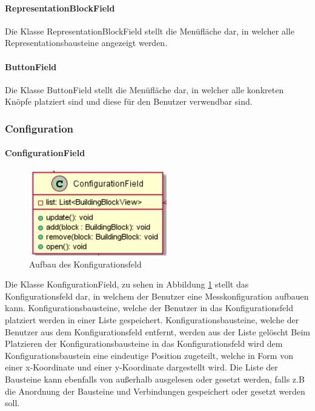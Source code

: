 \documentclass[parskip=full]{scrartcl}
\begin{document}
\paragraph{RepresentationBlockField}
Die Klasse RepresentationBlockField stellt die Menüfläche dar, in welcher alle Representationsbausteine angezeigt werden.

\paragraph{ButtonField}
Die Klasse ButtonField stellt die Menüfläche dar, in welcher alle konkreten Knöpfe platziert sind und diese für den Benutzer verwendbar sind.

\subsubsection{Configuration}


\paragraph{ConfigurationField}

\begin{figure}[htbp]
	\begin{center}
		\includegraphics[width = 6cm]{Grafiken/View/ConfigurationField.PNG}
		\caption{Aufbau des Konfigurationsfeld}
		\label{Konfigurationsfeld}
	\end{center}
\end{figure}

Die Klasse KonfigurationField, zu sehen in Abbildung \ref{Konfigurationsfeld} stellt das Konfigurationsfeld dar, in welchem der Benutzer eine Messkonfiguration aufbauen kann.
Konfigurationsbausteine, welche der Benutzer in das Konfigurationsfeld platziert werden in einer Liste gespeichert. 
Konfigurationsbausteine, welche der Benutzer aus dem Konfigurationsfeld entfernt, werden aus der Liste gelöscht
Beim Platzieren der Konfigurationsbausteine in das Konfigurationsfeld wird dem Konfigurationsbaustein eine eindeutige Position zugeteilt, welche in Form von einer x-Koordinate und einer y-Koordinate dargestellt wird.
Die Liste der Bausteine kann ebenfalls von außerhalb ausgelesen oder gesetzt werden, falls z.B die Anordnung der Bausteine und Verbindungen gespeichert oder gesetzt werden soll.
\end{document}
